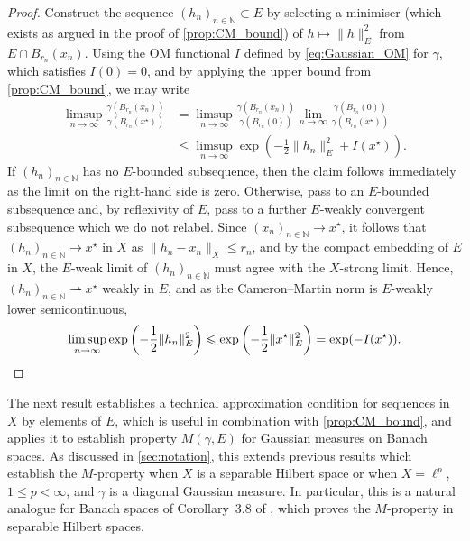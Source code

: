 \documentclass[11pt]{article}
\newcommand*{\cball}[2]{B_{#2}(#1)}
\newcommand*{\Naturals}{\mathbb{N}}
\renewcommand*{\leq}{\leqslant}
\newcommand*{\crcdfm}[3]{#1(\cball{#2}{#3})}
\theoremstyle{plain}
\theoremstyle{definition}
\newcommand{\norm}[1]{\lVert #1 \rVert}
\numberwithin{equation}{section}
\numberwithin{figure}{section}
\numberwithin{table}{section}
\begin{document}
\begin{proof}
	Construct the sequence $(h_n)_{n \in \Naturals} \subset E$ by selecting a minimiser (which exists as argued in the proof of \cref{prop:CM_bound}) of $h \mapsto \|h\|_{E}^{2}$ from $E \cap \cball{x_n}{r_n}$.
	Using the OM functional $I$ defined by \eqref{eq:Gaussian_OM} for $\gamma$, which satisfies $I(0) = 0$, and by applying the upper bound from \cref{prop:CM_bound}, we may write
	\begin{align*}
		\limsup_{n \to \infty} \frac{\crcdfm{\gamma}{x_n}{r_n}}{\crcdfm{\gamma}{x^{\star}}{r_n}} &= \limsup_{n \to \infty} \frac{\crcdfm{\gamma}{x_n}{r_n}}{\crcdfm{\gamma}{0}{r_n}} \lim_{n \to \infty} \frac{\crcdfm{\gamma}{0}{r_n}}{\crcdfm{\gamma}{x^{\star}}{r_n}} \\
		&\leq \limsup_{n \to \infty} \exp\left(-\frac{1}{2}\|h_n\|_{E}^{2} + I(x^{\star})\right).
	\end{align*}
	If $(h_n)_{n \in \Naturals}$ has no $E$-bounded subsequence, then the claim follows immediately as the limit on the right-hand side is zero.
	Otherwise, pass to an $E$-bounded subsequence and, by reflexivity of $E$, pass to a further $E$-weakly convergent subsequence which we do not relabel.
	Since $(x_{n})_{n \in \Naturals} \to x^{\star}$, it follows that $(h_{n})_{n \in \Naturals} \to x^{\star}$ in $X$ as $\norm{h_{n} - x_{n}}_X \leq r_{n}$, and by the compact embedding of $E$ in $X$, the $E$-weak limit of $(h_n)_{n \in \Naturals}$ must agree with the $X$-strong limit.
	Hence, $(h_n)_{n \in \Naturals} \rightharpoonup x^{\star}$ weakly in $E$, and as the Cameron--Martin norm is $E$-weakly lower semicontinuous,
	\begin{equation*}
		\limsup_{n \to \infty} \exp\left(-\frac{1}{2}\norm{h_{n}}_{E}^{2}\right) \leq \exp\left(-\frac{1}{2}\|x^{\star}\|_{E}^{2} \right) = \exp(-I(x^{\star})). \qedhere
	\end{equation*}
\end{proof}

The next result establishes a technical approximation condition for sequences in $X$ by elements of $E$, which is useful in combination with \cref{prop:CM_bound}, and applies it to establish property $M(\gamma, E)$ for Gaussian measures on Banach spaces.
As discussed in \cref{sec:notation}, this extends previous results which establish the $M$-property when $X$ is a separable Hilbert space or when $X = \ell^p$, $1 \leq p < \infty$, and $\gamma$ is a diagonal Gaussian measure.
In particular, this is a natural analogue for Banach spaces of Corollary~3.8 of \citet{DashtiLawStuartVoss2013}, which proves the $M$-property in separable Hilbert spaces.
\end{document}
